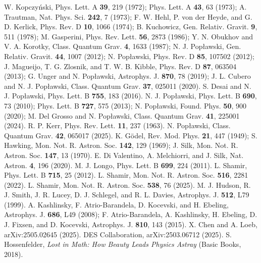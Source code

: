 \documentclass[prd,onecolumn,nofootinbib]{revtex4}
\begin{document}
\begin{thebibliography}{}
 W. Kopczy\'{n}ski, Phys. Lett. A {\bf 39}, 219 (1972); Phys. Lett. A {\bf 43}, 63 (1973); A. Trautman, Nat. Phys. Sci. {\bf 242}, 7 (1973); F. W. Hehl, P. von der Heyde, and G. D. Kerlick, Phys. Rev. D {\bf 10}, 1066 (1974); B. Kuchowicz, Gen. Relativ. Gravit. {\bf 9}, 511 (1978); M. Gasperini, Phys. Rev. Lett. {\bf 56}, 2873 (1986); Y. N. Obukhov and V. A. Korotky, Class. Quantum Grav. {\bf 4}, 1633 (1987); N. J. Pop{\l}awski, Gen. Relativ. Gravit. {\bf 44}, 1007 (2012); N. Pop{\l}awski, Phys. Rev. D {\bf 85}, 107502 (2012); J. Magueijo, T. G. Zlosnik, and T. W. B. Kibble, Phys. Rev. D {\bf 87}, 063504 (2013); G. Unger and N. Pop{\l}awski, Astrophys. J. {\bf 870}, 78 (2019); J. L. Cubero and N. J. Pop{\l}awski, Class. Quantum Grav. {\bf 37}, 025011 (2020).
 S. Desai and N. J. Pop{\l}awski, Phys. Lett. B {\bf 755}, 183 (2016).
 N. J. Pop{\l}awski, Phys. Lett. B {\bf 690}, 73 (2010); Phys. Lett. B {\bf 727}, 575 (2013); N. Pop{\l}awski, Found. Phys. {\bf 50}, 900 (2020); M. Del Grosso and N. Pop{\l}awski, Class. Quantum Grav. {\bf 41}, 225001 (2024).
 R. P. Kerr, Phys. Rev. Lett. {\bf 11}, 237 (1963).
 N. Pop{\l}awski, Class. Quantum Grav. {\bf 42}, 065017 (2025).
 K. G\"{o}del, Rev. Mod. Phys. {\bf 21}, 447 (1949); S. Hawking, Mon. Not. R. Astron. Soc. {\bf 142}, 129 (1969); J. Silk, Mon. Not. R. Astron. Soc. {\bf 147}, 13 (1970).
 E. Di Valentino, A. Melchiorri, and J. Silk, Nat. Astron. {\bf 4}, 196 (2020).
 M. J. Longo, Phys. Lett. B {\bf 699}, 224 (2011).
 L. Shamir, Phys. Lett. B {\bf 715}, 25 (2012).
 L. Shamir, Mon. Not. R. Astron. Soc. {\bf 516}, 2281 (2022).
 L. Shamir, Mon. Not. R. Astron. Soc. {\bf 538}, 76 (2025).
 M. J. Hudson, R. J. Smith, J. R. Lucey, D. J. Schlegel, and R. L. Davies, Astrophys. J. {\bf 512}, L79 (1999).
 A. Kashlinsky, F. Atrio-Barandela, D. Kocevski, and H. Ebeling, Astrophys. J. {\bf 686}, L49 (2008); F. Atrio-Barandela, A. Kashlinsky, H. Ebeling, D. J. Fixsen, and D. Kocevski, Astrophys. J. {\bf 810}, 143 (2015).
 X. Chen and A. Loeb, arXiv:2505.02645 (2025).
 DES Collaboration, arXiv:2503.06712 (2025).
 S. Hossenfelder, {\em Lost in Math: How Beauty Leads Physics Astray} (Basic Books, 2018).
\end{thebibliography}
\end{document}
